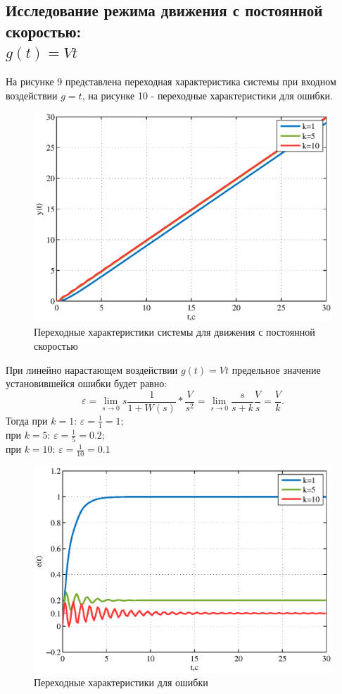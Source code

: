 \documentclass[a4paper,12pt]{article} %
\begin{document}
\subsection{Исследование режима движения с постоянной скоростью: \\$g(t)=Vt$} 
На рисунке 9 представлена переходная характеристика системы при входном воздействии $g=t$, на рисунке 10  - переходные характеристики для ошибки.
\begin{figure}[H]
	\centering
	\includegraphics[width=1\linewidth]{scheme/plot7.eps}
	\caption{Переходные характеристики системы для движения с постоянной скоростью}
\end{figure}
При линейно нарастающем воздействии $g(t)=Vt$ предельное значение установившейся ошибки будет равно:
\begin{equation}
    \varepsilon = \lim_{s\to 0}s\frac{1}{1+W(s)}*\frac{V}{s^2} = \lim_{s\to 0}\frac{s}{s+k}\frac{V}{s} = \frac{V}{k}.
\end{equation}
Тогда при $k=1$: $\varepsilon = \displaystyle{\frac{1}{1} = 1;}$\\
при $k=5$: $\varepsilon = \displaystyle{\frac{1}{5} = 0.2;}$\\
при $k=10$: $\varepsilon = \displaystyle{\frac{1}{10} = 0.1}$
\begin{figure}[H]
	\centering
	\includegraphics[width=1\linewidth]{scheme/plot8.eps}
	\caption{Переходные характеристики для ошибки}
\end{figure}
\end{document}
